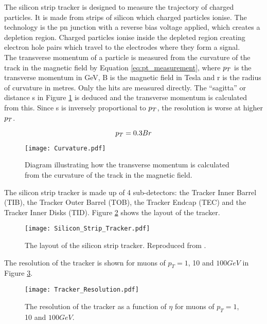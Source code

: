 The silicon strip tracker is designed to measure the trajectory of charged 
particles. It is made from strips of silicon which charged particles ionise. The
technology is the pn junction with a reverse bias voltage applied, which creates
a depletion region. Charged particles ionise inside the depleted region creating
electron hole pairs which travel to the electrodes where they form a signal. \\
  
The transverse momentum of a particle is measured from the curvature of the 
track in the magnetic field by Equation \ref{eq:pt_measurement}, where $p_{T}$ is
the transverse momentum in GeV, B is the magnetic field in Tesla and r is the
radius of curvature in metres. Only the hits are measured directly. The 
``sagitta'' or distance s in Figure \ref{fig:curvature} is deduced and the 
transverse momentum is calculated from this. Since s is inversely proportional 
to $p_{T}$, the resolution is worse at higher $p_{T}$.

\begin{equation}
p_{T} = 0.3Br
\label{eq:pt_measurement}
\end{equation}

\begin{figure}
\begin{center}
\texttt{[image: Curvature.pdf]}
\end{center}
\caption{Diagram illustrating how the transverse momentum is calculated from the
curvature of the track in the magnetic field.}
\label{fig:curvature}
\end{figure}

The silicon strip tracker is made up of 4 sub-detectors: the Tracker Inner 
Barrel (TIB), the Tracker Outer Barrel (TOB), the Tracker Endcap (TEC) and the
Tracker Inner Disks (TID). Figure \ref{fig:Silicon_Strip_Tracker} shows the 
layout of the tracker. \\

\begin{figure}
\texttt{[image: Silicon\_Strip\_Tracker.pdf]}
\caption{The layout of the silicon strip tracker. Reproduced from 
\cite{physics_tdr_1}.}
\label{fig:Silicon_Strip_Tracker}
\end{figure}

The resolution of the tracker is shown for muons of $p_{T} = 1$, 10 and $100 
\unit{GeV}$ in Figure \ref{fig:tracker_resolution}.

\begin{figure}
\texttt{[image: Tracker\_Resolution.pdf]}
\caption{The resolution of the tracker as a function of $\eta$ for muons of
$p_{T} = 1$, 10 and $100 \unit{GeV}$.}
\label{fig:tracker_resolution}
\end{figure}


